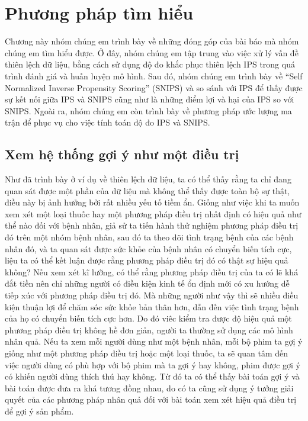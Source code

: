 \chapter{Phương pháp tìm hiểu}
\label{Chapter3}

Chương này nhóm chúng em trình bày về những đóng góp của bài báo mà nhóm chúng em tìm hiểu được. Ở đây, nhóm chúng em tập trung vào việc xử lý vấn đề thiên lệch dữ liệu, bằng cách sử dụng độ đo khắc phục thiên lệch IPS trong quá trình đánh giá và huấn luyện mô hình. Sau đó, nhóm chúng em trình bày về ``Self Normalized Inverse Propensity Scoring'' (SNIPS) và so sánh với IPS để thấy được sự kết nối giữa IPS và SNIPS cũng như là những điểm lợi và hại của IPS so với SNIPS. Ngoài ra, nhóm chúng em còn trình bày về phương pháp ước lượng ma trận để phục vụ cho việc tính toán độ đo IPS và SNIPS.

\section{Xem hệ thống gợi ý như một điều trị}
Như đã trình bày ở ví dụ về thiên lệch dữ liệu, ta có thể thấy rằng ta chỉ đang quan sát được một phần của dữ liệu mà không thể thấy được toàn bộ sự thật, điều này bị ảnh hưởng bởi rất nhiều yếu tố tiềm ẩn. Giống như việc khi ta muốn xem xét một loại thuốc hay một phương pháp điều trị nhất định có hiệu quả như thể nào đối với bệnh nhân,  giả sử ta tiến hành thử nghiệm phương pháp điều trị đó trên một nhóm bệnh nhân, sau đó ta theo dõi tình trạng bệnh của các bệnh nhân đó, và ta quan sát được sức khỏe của bệnh nhân có chuyển biến tích cực, liệu ta có thể kết luận được rằng phương pháp điều trị đó có thật sự hiệu quả không? Nếu xem xét kĩ lưỡng, có thể rằng phương pháp điều trị của ta có lẽ  khá đắt tiền nên chỉ những người có điều kiện kinh tế ổn định mới có xu hướng dễ tiếp xúc với phương pháp điều trị đó. Mà những người như vậy thì sẽ nhiều điều kiện thuận lợi để chăm sóc sức khỏe bản thân hơn, dẫn đến việc tình trạng bệnh của họ có chuyển biến tích cực hơn. Do đó viêc kiểm tra được độ hiệu quả một phương pháp điều trị không hề đơn giản, người ta thường sử dụng các mô hình nhân quả. Nếu ta xem mỗi người dùng như một bệnh nhân, mỗi bộ phim ta gợị ý giống như một phương pháp điều trị hoặc một loại thuốc, ta sẽ quan tâm đến việc người dùng có phù hợp với bộ phim mà ta gợi ý hay không, phim được gợi ý có khiến người dùng thích thú hay không. Từ đó ta có thể thấy bài toán gợi ý và bài toán được đưa ra khá tương đồng nhau, do có ta cũng sử dụng ý tưởng giải quyết của các phương pháp nhân quả đối với bài toán xem xét hiệu quả điều trị để gợi ý sản phẩm. 


